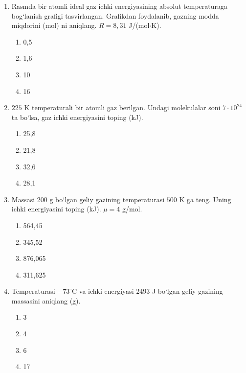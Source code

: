 \begin{enumerate}
\item Rasmda bir atomli ideal gaz ichki energiyasining absolut temperaturaga bog‘lanish grafigi tasvirlangan. Grafikdan foydalanib, gazning modda miqdorini (mol) ni aniqlang. $R=8,31$ J/(mol$\cdot$K).


\begin{enumerate}[label=\Alph*)]
\item 0,5
\item 1,6
\item 10
\item 16

\end{enumerate}

\item $225$ K temperaturali bir atomli gaz berilgan. Undagi molekulalar soni $7\cdot10^{24}$ ta bo‘lsa, gaz ichki energiyasini toping (kJ).
\begin{enumerate}[label=\Alph*)]
\item 25,8
\item 21,8
\item 32,6
\item 28,1

\end{enumerate}

\item Massasi $200$ g bo‘lgan geliy gazining temperaturasi $500$ K ga teng. Uning ichki energiyasini toping (kJ). $\mu=4$ g/mol.
\begin{enumerate}[label=\Alph*)]
\item 564,45
\item 345,52
\item 876,065
\item 311,625

\end{enumerate}

\item Temperaturasi $-73^\circ$C va ichki energiyasi $2493$ J bo‘lgan geliy gazining massasini aniqlang (g).
\begin{enumerate}[label=\Alph*)]
\item 3
\item 4
\item 6
\item 17


\end{enumerate}
\end{enumerate}
